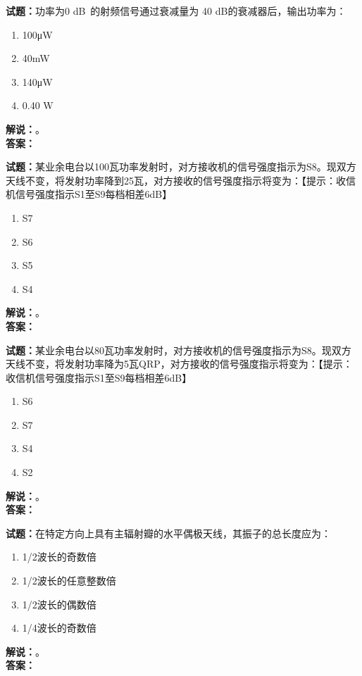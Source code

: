 \documentclass{ctexbook}
\begin{document}
\bigskip

\noindent\textbf{试题：}功率为0 \unit[qualifier-mode=combine]{\deci\bel{}}的射频信号通过衰减量为 40 dB的衰减器后，输出功率为：
\begin{enumerate}[leftmargin=3em]
  \item 100μW
  \item 40mW
  \item 140μW
  \item 0.40 W
\end{enumerate}
\noindent\textbf{解说：}\textbf{}。\\\noindent\textbf{答案：}

\bigskip

\noindent\textbf{试题：}某业余电台以100瓦功率发射时，对方接收机的信号强度指示为S8。现双方天线不变，将发射功率降到25瓦，对方接收的信号强度指示将变为：【提示：收信机信号强度指示S1至S9每档相差6dB】
\begin{enumerate}[leftmargin=3em]
  \item S7
  \item S6
  \item S5
  \item S4
\end{enumerate}
\noindent\textbf{解说：}\textbf{}。\\\noindent\textbf{答案：}

\bigskip

\noindent\textbf{试题：}某业余电台以80瓦功率发射时，对方接收机的信号强度指示为S8。现双方天线不变，将发射功率降为5瓦QRP，对方接收的信号强度指示将变为：【提示：收信机信号强度指示S1至S9每档相差6dB】
\begin{enumerate}[leftmargin=3em]
  \item S6
  \item S7
  \item S4
  \item S2
\end{enumerate}
\noindent\textbf{解说：}\textbf{}。\\\noindent\textbf{答案：}

\bigskip

\noindent\textbf{试题：}在特定方向上具有主辐射瓣的水平偶极天线，其振子的总长度应为：
\begin{enumerate}[leftmargin=3em]
  \item 1/2波长的奇数倍
  \item 1/2波长的任意整数倍
  \item 1/2波长的偶数倍
  \item 1/4波长的奇数倍
\end{enumerate}
\noindent\textbf{解说：}\textbf{}。\\\noindent\textbf{答案：}
\end{document}
